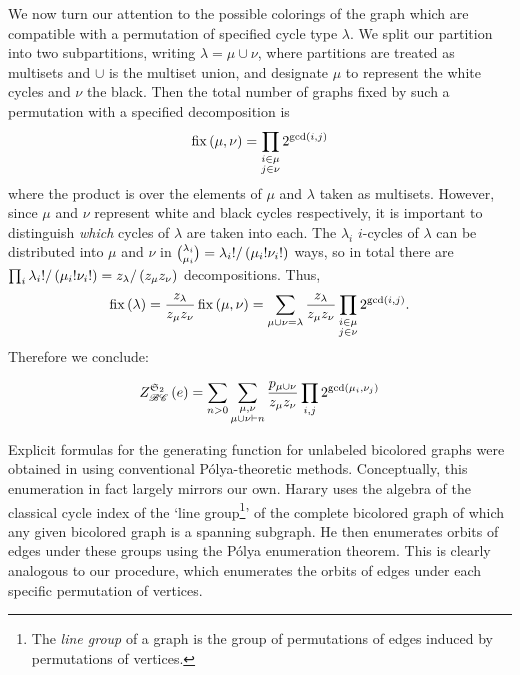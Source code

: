 \documentclass[distribution,draft]{brandiss} %
\numberwithin{section}{chapter}
\numberwithin{figure}{chapter}
\begin{document}
We now turn our attention to the possible colorings of the graph which are compatible with a permutation of specified cycle type $\lambda$.
We split our partition into two subpartitions, writing $\lambda = \mu \cup \nu$, where partitions are treated as multisets and $\cup$ is the multiset union, and designate $\mu$ to represent the white cycles and $\nu$ the black.
Then the total number of graphs fixed by such a permutation with a specified decomposition is
\begin{equation*}
  \operatorname{fix} \left( {\mu, \nu} \right) = \prod_{\substack{i \in \mu \\ j \in \nu}} 2^{\gcd \left( {i, j} \right)}
\end{equation*}
where the product is over the elements of $\mu$ and $\lambda$ taken as multisets.
However, since $\mu$ and $\nu$ represent white and black cycles respectively, it is important to distinguish \emph{which} cycles of $\lambda$ are taken into each.
The $\lambda_{i}$ $i$-cycles of $\lambda$ can be distributed into $\mu$ and $\nu$ in $\binom{\lambda_{i}}{\mu_{i}} = \lambda_{i}! / \left( {\mu_{i}! \nu_{i}!} \right)$ ways, so in total there are $\prod_{i} \lambda_{i}! / \left( {\mu_{i}! \nu_{i}!} \right) = z_{\lambda} / \left( {z_{\mu} z_{\nu}} \right)$ decompositions.
Thus,
\begin{equation*}
  \operatorname{fix} \left( {\lambda} \right) = \frac{z_{\lambda}}{z_{\mu} z_{\nu}} \operatorname{fix} \left( {\mu, \nu} \right) = \sum_{\mu \cup \nu = \lambda} \frac{z_{\lambda}}{z_{\mu} z_{\nu}} \prod_{\substack{i \in \mu \\ j \in \nu}} 2^{\gcd \left( {i, j} \right)}.
\end{equation*}
Therefore we conclude:
\begin{theorem}
  \begin{equation}
    \label{eq:ecibc}
    \gcielt{\symgp{2}}{\specname{BC}}{e} = \sum_{n > 0} \sum_{\substack{\mu, \nu \\ \mu \cup \nu \vdash n}} \frac{p_{\mu \cup \nu}}{z_{\mu} z_{\nu}} \prod_{i, j} 2^{\gcd \pbrac{\mu_{i}, \nu_{j}}}
  \end{equation}
\end{theorem}

Explicit formulas for the generating function for unlabeled bicolored graphs were obtained in \cite{har:bicolored} using conventional P\'{o}lya-theoretic methods.
Conceptually, this enumeration in fact largely mirrors our own.
Harary uses the algebra of the classical cycle index of the `line group\footnote{The \emph{line group} of a graph is the group of permutations of edges induced by permutations of vertices.}' of the complete bicolored graph of which any given bicolored graph is a spanning subgraph.
He then enumerates orbits of edges under these groups using the P\'{o}lya enumeration theorem.
This is clearly analogous to our procedure, which enumerates the orbits of edges under each specific permutation of vertices.
\end{document}
